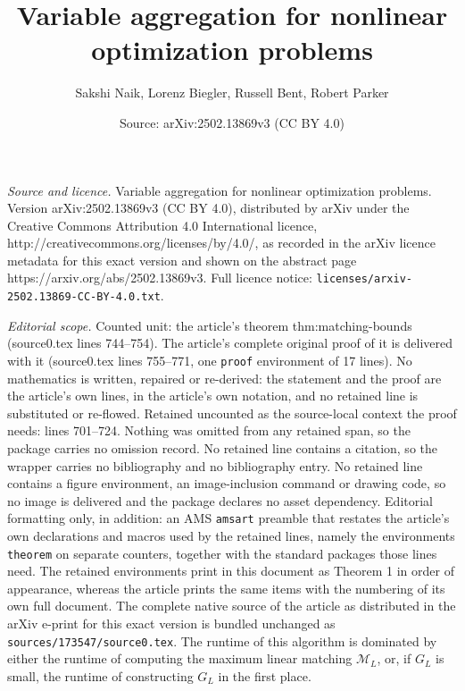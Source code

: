\documentclass[10pt,a4paper]{amsart}
\title{Variable aggregation for nonlinear optimization problems}
\author{Sakshi Naik, Lorenz Biegler, Russell Bent, Robert Parker}
\date{Source: arXiv:2502.13869v3 (CC BY 4.0)}
\newcommand{\rev}[1]{{#1}}
\begin{document}
\maketitle

\noindent\emph{Source and licence.} Variable aggregation for nonlinear optimization problems. Version arXiv:2502.13869v3 (CC BY 4.0), distributed by arXiv under the Creative Commons Attribution 4.0 International licence, http://creativecommons.org/licenses/by/4.0/, as recorded in the arXiv licence metadata for this exact version and shown on the abstract page https://arxiv.org/abs/2502.13869v3. Full licence notice: \texttt{licenses/arxiv-2502.13869-CC-BY-4.0.txt}.\par\smallskip

\noindent\textit{Editorial scope.} Counted unit: the article's theorem thm:matching-bounds (source0.tex lines 744--754). The article's complete original proof of it is delivered with it (source0.tex lines 755--771, one \texttt{proof} environment of 17 lines). No mathematics is written, repaired or re-derived: the statement and the proof are the article's own lines, in the article's own notation, and no retained line is substituted or re-flowed.  Retained uncounted as the source-local context the proof needs: lines 701--724.  Nothing was omitted from any retained span, so the package carries no omission record.  No retained line contains a citation, so the wrapper carries no bibliography and no bibliography entry.  No retained line contains a figure environment, an image-inclusion command or drawing code, so no image is delivered and the package declares no asset dependency.  Editorial formatting only, in addition: an AMS \texttt{amsart} preamble that restates the article's own declarations and macros used by the retained lines, namely the environments \texttt{theorem} on separate counters, together with the standard packages those lines need.  The retained environments print in this document as Theorem 1 in order of appearance, whereas the article prints the same items with the numbering of its own full document.  The complete native source of the article as distributed in the arXiv e-print for this exact version is bundled unchanged as \texttt{sources/173547/source0.tex}.
The runtime of this algorithm is dominated by either the runtime of computing the
maximum linear matching $\rev{\mathcal{M}}_L$, or, if $G_L$ is small, the runtime of constructing
$G_L$ in the first place.
\end{document}
